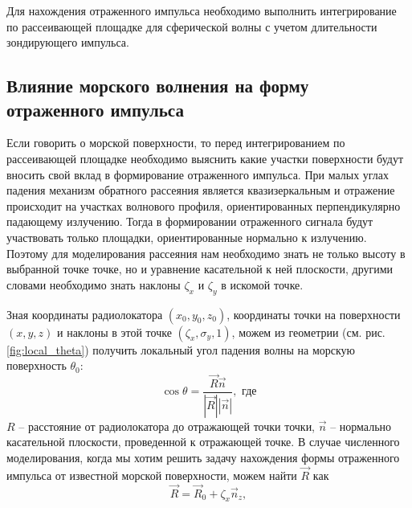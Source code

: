 Для нахождения отраженного импульса необходимо выполнить интегрирование по
рассеивающей площадке для сферической волны с учетом длительности зондирующего
импульса.


\subsection{Влияние морского волнения на форму отраженного импульса}%
\label{sub:vliianie_morskogo_volneniia_na_vormu_otrazhennogo_impul_sa}

Если говорить о морской поверхности, то перед интегрированием по рассеивающей
площадке необходимо выяснить какие участки поверхности будут вносить свой вклад
в формирование отраженного импульса.  При малых углах падения механизм обратного  рассеяния является квазизеркальным и отражение происходит на участках волнового профиля, ориентированных
перпендикулярно падающему излучению. Тогда в формировании отраженного сигнала
будут участвовать только площадки, ориентированные нормально к излучению. 
Поэтому для моделирования рассеяния нам необходимо знать не только высоту
в выбранной точке точке, но и уравнение касательной к ней плоскости, другими словами необходимо знать наклоны $\zeta_x$ и  $\zeta_y$ в искомой точке.


Зная координаты радиолокатора  $(x_0,y_0,z_0)$, координаты точки на
поверхности $(x,y,z)$ и наклоны в этой точке $(\zeta_x,\sigma_y,1)$, можем из
геометрии (см. рис. \ref{fig:local_theta}) получить локальный угол падения
волны на морскую поверхность $\theta_0$:
\begin{equation}
    \label{eq:local_theta}
    \cos \theta =  \frac{\vec R \vec n}{|\vec R| |\vec n|}, \text{ где}
\end{equation}
$R$ -- расстояние от радиолокатора до отражающей точки точки,
 $\vec n$ -- нормально касательной плоскости, проведенной к отражающей точке.
 В случае численного моделирования, когда мы хотим решить задачу нахождения
 формы отраженного импульса от известной морской поверхности, можем найти
 $\vec R$ как
 \begin{equation}
     \label{eq:R_1}
     \vec R = \vec R_0 + \zeta_x \vec n_z,
 \end{equation}





